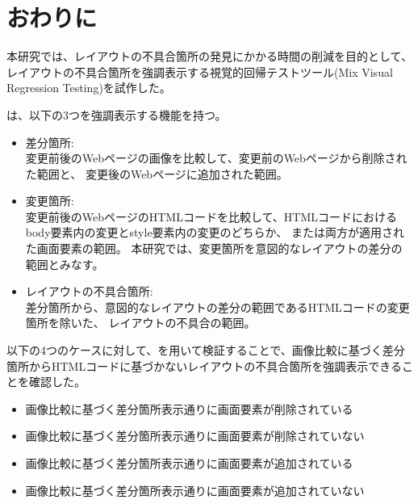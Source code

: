 \chapter{おわりに}\label{cha:Conclusion}
本研究では、レイアウトの不具合箇所の発見にかかる時間の削減を目的として、
レイアウトの不具合箇所を強調表示する視覚的回帰テストツール\toolName(Mix Visual Regression Testing)を試作した。
\par
\toolName は、以下の3つを強調表示する機能を持つ。
\begin{itemize}
      \item 差分箇所:\\
            変更前後のWebページの画像を比較して、変更前のWebページから削除された範囲と、
            変更後のWebページに追加された範囲。
      \item 変更箇所:\\
            変更前後のWebページのHTMLコードを比較して、HTMLコードにおけるbody要素内の変更とstyle要素内の変更のどちらか、
            または両方が適用された画面要素の範囲。
            本研究では、変更箇所を意図的なレイアウトの差分の範囲とみなす。
      \item レイアウトの不具合箇所:\\
            差分箇所から、意図的なレイアウトの差分の範囲であるHTMLコードの変更箇所を除いた、
            レイアウトの不具合の範囲。
\end{itemize}
\par
以下の4つのケースに対して、\toolName を用いて検証することで、画像比較に基づく差分箇所からHTMLコードに基づかないレイアウトの不具合箇所を強調表示できることを確認した。
\begin{itemize}
      \item 画像比較に基づく差分箇所表示通りに画面要素が削除されている
      \item 画像比較に基づく差分箇所表示通りに画面要素が削除されていない
      \item 画像比較に基づく差分箇所表示通りに画面要素が追加されている
      \item 画像比較に基づく差分箇所表示通りに画面要素が追加されていない
\end{itemize}
\par
